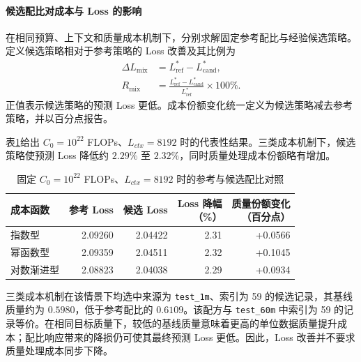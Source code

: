 \documentclass[bwprint]{gmcmthesis}
\numberwithin{equation}{section}
\numberwithin{figure}{section}
\numberwithin{table}{section}
\begin{document}
        \paragraph{候选配比对成本与 Loss 的影响}

        在相同预算、上下文和质量成本机制下，分别求解固定参考配比与经验候选策略。定义候选策略相对于参考策略的 Loss 改善及其比例为
        \begin{equation}
        \begin{aligned}
        \Delta L_{\mathrm{mix}}
        &=L_{\mathrm{ref}}^*-L_{\mathrm{cand}}^*,\\
        R_{\mathrm{mix}}
        &=\frac{L_{\mathrm{ref}}^*-L_{\mathrm{cand}}^*}{L_{\mathrm{ref}}^*}\times100\%.
        \end{aligned}
        \label{eq:p3_mixture_improvement}
        \end{equation}
        正值表示候选策略的预测 Loss 更低。成本份额变化统一定义为候选策略减去参考策略，并以百分点报告。

        表\ref{tab:p3_mixture_comparison}给出 $C_0=10^{22}$ FLOPs、$L_{ctx}=8192$ 时的代表性结果。三类成本机制下，候选策略使预测 Loss 降低约 $2.29\%$ 至 $2.32\%$，同时质量处理成本份额略有增加。

        \begin{table}[htbp]
        \centering
        \small
        \caption{固定 $C_0=10^{22}$ FLOPs、$L_{ctx}=8192$ 时的参考与候选配比对照}
        \label{tab:p3_mixture_comparison}
        \begin{tabular}{lrrrr}
        \toprule
        成本函数 & 参考 Loss & 候选 Loss & \shortstack{Loss 降幅\\（\%）} & \shortstack{质量份额变化\\（百分点）} \\
        \midrule
        指数型 & 2.09260 & 2.04422 & 2.31 & +0.0566 \\
        幂函数型 & 2.09359 & 2.04511 & 2.32 & +0.1045 \\
        对数渐进型 & 2.08823 & 2.04038 & 2.29 & +0.0934 \\
        \bottomrule
        \end{tabular}
        \end{table}

        三类成本机制在该情景下均选中来源为 \texttt{test\_1m}、索引为 59 的候选记录，其基线质量约为 $0.5980$，低于参考配比的 $0.6109$。该配方与 \texttt{test\_60m} 中索引为 59 的记录等价。在相同目标质量下，较低的基线质量意味着更高的单位数据质量提升成本；配比响应带来的降损仍可使其最终预测 Loss 更低。因此，Loss 改善并不要求质量处理成本同步下降。
\end{document}

